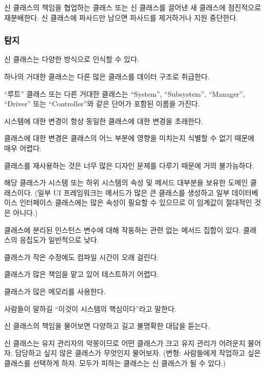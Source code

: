\documentclass[a4paper,10pt,twoside]{book}
\begin{document}
신 클래스의 책임을 협업하는 클래스 또는 신 클래스를 끌어낸 새 클래스에 점진적으로 재분배한다. 신 클래스에 파사드만 남으면 파사드를 제거하거나 지원 중단한다.

\subsubsection*{탐지}

신 클래스는 다양한 방식으로 인식할 수 있다.

\begin{bulletlist}
\item 하나의 거대한 클래스는 다른 많은 클래스를 데이터 구조로 취급한다.

\item ``루트'' 클래스 또는 다른 거대한 클래스는 ``System'', ``Subsystem'', ``Manager'', ``Driver'' 또는 ``Controller''와 같은 단어가 포함된 이름을 가진다.

\item 시스템에 대한 변경이 항상 동일한 클래스에 대한 변경을 초래한다.

\item 클래스에 대한 변경은 클래스의 어느 부분에 영향을 미치는지 식별할 수 없기 때문에 매우 어렵다.

\item 클래스를 재사용하는 것은 너무 많은 디자인 문제를 다루기 때문에 거의 불가능하다.

\item 해당 클래스가 시스템 또는 하위 시스템의 속성 및 메서드 대부분을 보유한 도메인 클래스이다. (일부 UI 프레임워크는 메서드가 많은 큰 클래스를 생성하고 일부 데이터베이스 인터페이스 클래스에는 많은 속성이 필요할 수 있으므로 이 임계값이 절대적인 것은 아니다.) 

\item 클래스에 분리된 인스턴스 변수에 대해 작동하는 관련 없는 메서드 집합이 있다. 클래스의 응집도가 일반적으로 낮다. 

\item 클래스가 작은 수정에도 컴파일 시간이 오래 걸린다.

\item 클래스가 많은 책임을 맡고 있어 테스트하기 어렵다.

\item 클래스가 많은 메모리를 사용한다.

\item 사람들이 말하길 ``이것이 시스템의 핵심이다''라고 말한다.

\item 신 클래스의 책임을 물어보면 다양하고 길고 불명확한 대답을 듣는다.

\item 신 클래스는 유지 관리자의 악몽이므로 어떤 클래스가 크고 유지 관리가 어려운지 물어자. 담당하고 싶지 않은 클래스가 무엇인지 물어보자. (변형: 사람들에게 작업하고 싶은 클래스를 선택하게 하자. 모두가 피하는 클래스는 신 클래스가 될 수 있다.)
\end{bulletlist}
\end{document}
